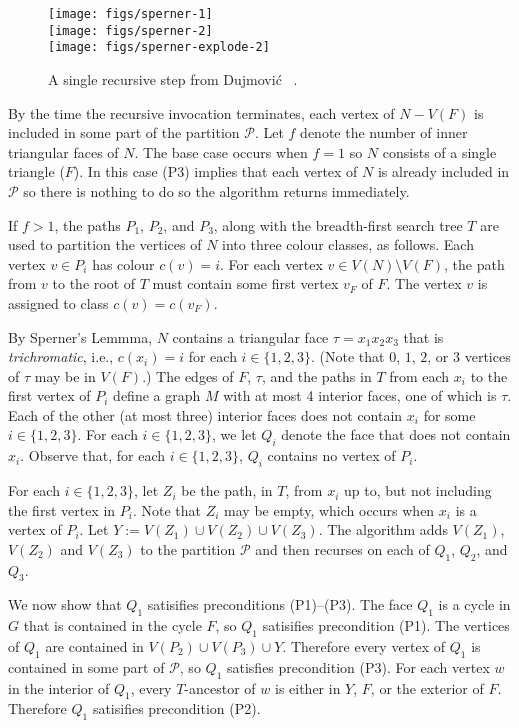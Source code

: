 \documentclass[kpfonts]{patmorin}
\begin{document}
\begin{figure}
  \begin{center}
    \texttt{[image: figs/sperner-1]} \\[1ex]
    \texttt{[image: figs/sperner-2]} \\[1ex]
    \texttt{[image: figs/sperner-explode-2]}
  \end{center}
  \caption{A single recursive step from Dujmović \etal\  \cite{dujmovic.joret.ea:planar}.}
\end{figure}

By the time the recursive invocation terminates, each vertex of $N-V(F)$ is included in some part of the partition $\mathcal{P}$. Let $f$ denote the number of inner triangular faces of $N$.  The base case occurs when $f=1$ so $N$ consists of a single triangle ($F$).  In this case (P3) implies that each vertex of $N$ is already included in $\mathcal{P}$ so there is nothing to do so the algorithm returns immediately.

If $f>1$, the paths $P_1$, $P_2$, and $P_3$, along with the breadth-first search tree $T$ are used to partition the vertices of $N$ into three colour classes, as follows.  Each vertex $v\in P_i$ has colour $c(v)=i$.  For each vertex $v\in V(N)\setminus V(F)$, the path from $v$ to the root of $T$ must contain some first vertex $v_F$ of $F$.  The vertex $v$ is assigned to class $c(v)=c(v_F)$.

By Sperner's Lemmma, $N$ contains a triangular face $\tau=x_1x_2x_3$ that is \emph{trichromatic}, i.e., $c(x_i)=i$ for each $i\in\{1,2,3\}$. (Note that $0$, $1$, $2$, or $3$ vertices of $\tau$ may be in $V(F)$.)  The edges of $F$, $\tau$, and the paths in $T$ from each $x_i$ to the first vertex of $P_i$ define a graph $M$ with at most 4 interior faces, one of which is $\tau$.  Each of the other (at most three) interior faces does not contain $x_i$ for some $i\in\{1,2,3\}$. For each $i\in\{1,2,3\}$, we let $Q_i$ denote the face that does not contain $x_i$. Observe that, for each $i\in\{1,2,3\}$, $Q_i$ contains no vertex of $P_i$.

For each $i\in\{1,2,3\}$, let $Z_i$ be the path, in $T$, from $x_i$ up to, but not including the first vertex in $P_i$.  Note that $Z_i$ may be empty, which occurs when $x_i$ is a vertex of $P_i$.  Let $Y:=V(Z_1)\cup V(Z_2)\cup V(Z_3)$.  The algorithm adds $V(Z_1)$, $V(Z_2)$ and $V(Z_3)$ to the partition $\mathcal{P}$ and then recurses on each of $Q_1$, $Q_2$, and $Q_3$.

We now show that $Q_1$ satisifies preconditions (P1)--(P3). The face $Q_1$ is a cycle in $G$ that is contained in the cycle $F$, so $Q_1$ satisifies precondition (P1).  The vertices of $Q_1$ are contained in $V(P_2)\cup V(P_3)\cup Y$.  Therefore every vertex of $Q_1$ is contained in some part of $\mathcal{P}$, so $Q_1$ satisfies precondition (P3).  For each vertex $w$ in the interior of $Q_1$, every $T$-ancestor of $w$ is either in $Y$, $F$, or the exterior of $F$.  Therefore $Q_1$ satisifies precondition (P2).
\end{document}
